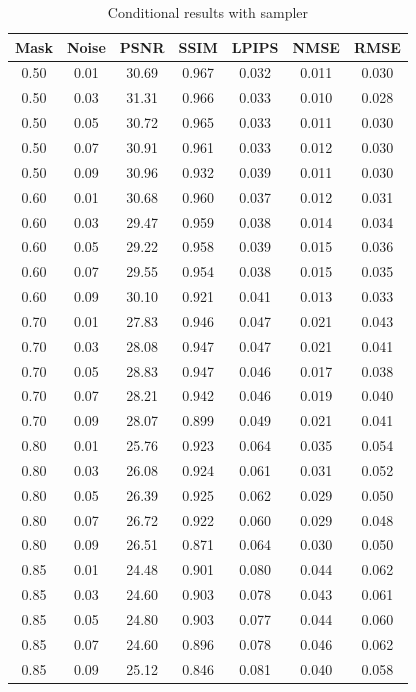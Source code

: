 \begin{table}[htbp]
\centering
\caption{Conditional results with sampler}
\label{tab:cond_sampler}
\begin{tabular}{ccccccc}
\toprule
Mask & Noise & PSNR & SSIM & LPIPS & NMSE & RMSE \\\midrule
0.50 & 0.01 & 30.69 & 0.967 & 0.032 & 0.011 & 0.030 \\
0.50 & 0.03 & 31.31 & 0.966 & 0.033 & 0.010 & 0.028 \\
0.50 & 0.05 & 30.72 & 0.965 & 0.033 & 0.011 & 0.030 \\
0.50 & 0.07 & 30.91 & 0.961 & 0.033 & 0.012 & 0.030 \\
0.50 & 0.09 & 30.96 & 0.932 & 0.039 & 0.011 & 0.030 \\
0.60 & 0.01 & 30.68 & 0.960 & 0.037 & 0.012 & 0.031 \\
0.60 & 0.03 & 29.47 & 0.959 & 0.038 & 0.014 & 0.034 \\
0.60 & 0.05 & 29.22 & 0.958 & 0.039 & 0.015 & 0.036 \\
0.60 & 0.07 & 29.55 & 0.954 & 0.038 & 0.015 & 0.035 \\
0.60 & 0.09 & 30.10 & 0.921 & 0.041 & 0.013 & 0.033 \\
0.70 & 0.01 & 27.83 & 0.946 & 0.047 & 0.021 & 0.043 \\
0.70 & 0.03 & 28.08 & 0.947 & 0.047 & 0.021 & 0.041 \\
0.70 & 0.05 & 28.83 & 0.947 & 0.046 & 0.017 & 0.038 \\
0.70 & 0.07 & 28.21 & 0.942 & 0.046 & 0.019 & 0.040 \\
0.70 & 0.09 & 28.07 & 0.899 & 0.049 & 0.021 & 0.041 \\
0.80 & 0.01 & 25.76 & 0.923 & 0.064 & 0.035 & 0.054 \\
0.80 & 0.03 & 26.08 & 0.924 & 0.061 & 0.031 & 0.052 \\
0.80 & 0.05 & 26.39 & 0.925 & 0.062 & 0.029 & 0.050 \\
0.80 & 0.07 & 26.72 & 0.922 & 0.060 & 0.029 & 0.048 \\
0.80 & 0.09 & 26.51 & 0.871 & 0.064 & 0.030 & 0.050 \\
0.85 & 0.01 & 24.48 & 0.901 & 0.080 & 0.044 & 0.062 \\
0.85 & 0.03 & 24.60 & 0.903 & 0.078 & 0.043 & 0.061 \\
0.85 & 0.05 & 24.80 & 0.903 & 0.077 & 0.044 & 0.060 \\
0.85 & 0.07 & 24.60 & 0.896 & 0.078 & 0.046 & 0.062 \\
0.85 & 0.09 & 25.12 & 0.846 & 0.081 & 0.040 & 0.058 \\

\end{tabular}
\end{table}
